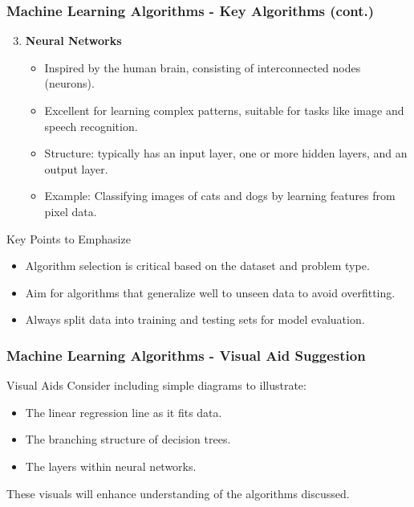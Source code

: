 \documentclass[aspectratio=169]{beamer}
\begin{document}
\begin{frame}[fragile]
    \frametitle{Machine Learning Algorithms - Key Algorithms (cont.)}
    \begin{enumerate}
        \setcounter{enumi}{2} %
        \item \textbf{Neural Networks}
        \begin{itemize}
            \item Inspired by the human brain, consisting of interconnected nodes (neurons).
            \item Excellent for learning complex patterns, suitable for tasks like image and speech recognition.
            \item Structure: typically has an input layer, one or more hidden layers, and an output layer.
            \item Example: Classifying images of cats and dogs by learning features from pixel data.
        \end{itemize}
    \end{enumerate}
    \begin{block}{Key Points to Emphasize}
        \begin{itemize}
            \item Algorithm selection is critical based on the dataset and problem type.
            \item Aim for algorithms that generalize well to unseen data to avoid overfitting.
            \item Always split data into training and testing sets for model evaluation.
        \end{itemize}
    \end{block}
\end{frame}

\begin{frame}[fragile]
    \frametitle{Machine Learning Algorithms - Visual Aid Suggestion}
    \begin{block}{Visual Aids}
        Consider including simple diagrams to illustrate:
        \begin{itemize}
            \item The linear regression line as it fits data.
            \item The branching structure of decision trees.
            \item The layers within neural networks.
        \end{itemize}
        These visuals will enhance understanding of the algorithms discussed.
    \end{block}
\end{frame}
\end{document}
